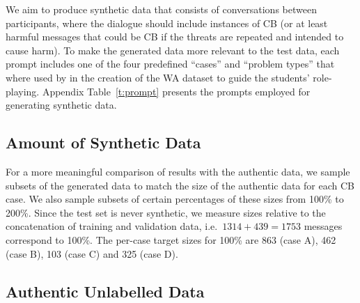 We aim to produce synthetic data that consists of conversations between participants, where the dialogue should include instances of CB (or at least harmful messages that could be CB if the threats are repeated and intended to cause harm).
To make the generated data more relevant to the test data, each prompt includes one of the four predefined ``cases'' and ``problem types'' that where used by  in the creation of the WA dataset to guide the students' role-playing.
Appendix Table~\ref{t:prompt} presents the prompts employed for generating synthetic data.


\subsection{Amount of Synthetic Data}

For a more meaningful comparison of results with the authentic data, we sample subsets of the generated data to match the size of the authentic data for each CB case.
We also sample subsets of certain percentages of these sizes
from 100\% to 200\%.
Since the test set is never synthetic, we measure sizes relative to the concatenation of training and validation data, i.e.\ $1314+439=1753$ messages correspond to 100\%. 
The per-case target sizes for 100\% are
 863 (case A),
 462 (case B),
 103 (case C) and
 325 (case D).
 

\subsection{Authentic Unlabelled Data}

